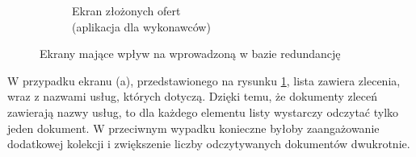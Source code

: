 \begin{figure}[ht]
\begin{subfigure}{0.32\textwidth}
    \caption{Ekran złożonych ofert\\(aplikacja dla wykonawców)}
  \end{subfigure}
  \caption{Ekrany mające wpływ na wprowadzoną w bazie redundancję}
  \label{fig:ekrany-redundancja}
\end{figure}

W przypadku ekranu (a), przedstawionego na rysunku \ref{fig:ekrany-redundancja}, lista zawiera zlecenia, wraz z nazwami usług, których dotyczą. Dzięki temu, że dokumenty zleceń zawierają nazwy usług, to dla każdego elementu listy wystarczy odczytać tylko jeden dokument. W przeciwnym wypadku konieczne byłoby zaangażowanie dodatkowej kolekcji i zwiększenie liczby odczytywanych dokumentów dwukrotnie.

